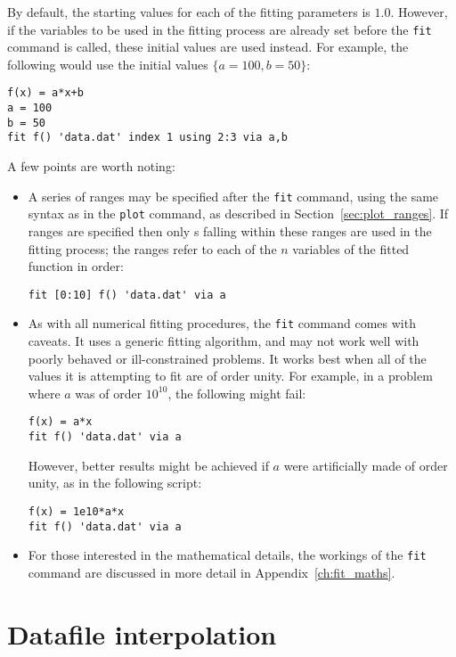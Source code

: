 By default, the starting values for each of the fitting parameters is
$1.0$. However, if the variables to be used in the fitting process are already
set before the {\tt fit} command is called, these initial values are used
instead. For example, the following would use the initial values
$\{a=100,b=50\}$:
\begin{verbatim}
f(x) = a*x+b
a = 100
b = 50
fit f() 'data.dat' index 1 using 2:3 via a,b
\end{verbatim}

A few points are worth noting:

\begin{itemize}
\item A series of ranges may be specified after the {\tt fit} command, using
the same syntax as in the {\tt plot} command, as described in
Section~\ref{sec:plot_ranges}. If ranges are specified then only \datapoint s
falling within these ranges are used in the fitting process; the ranges refer
to each of the $n$ variables of the fitted function in order:
\begin{verbatim}
fit [0:10] f() 'data.dat' via a
\end{verbatim}

\item As with all numerical fitting procedures, the {\tt fit} command comes
with caveats. It uses a generic fitting algorithm, and may not work well with
poorly behaved or ill-constrained problems. It works best when all of the
values it is attempting to fit are of order unity. For example, in a problem
where $a$ was of order $10^{10}$, the following might fail:
\begin{verbatim}
f(x) = a*x
fit f() 'data.dat' via a
\end{verbatim}
However, better results might be achieved if $a$ were artificially made of
order unity, as in the following script:
\begin{verbatim}
f(x) = 1e10*a*x
fit f() 'data.dat' via a
\end{verbatim}

\item For those interested in the mathematical details, the workings of the
{\tt fit} command are discussed in more detail in Appendix~\ref{ch:fit_maths}.

\end{itemize}

\section{Datafile interpolation}
\label{sec:spline_command}

